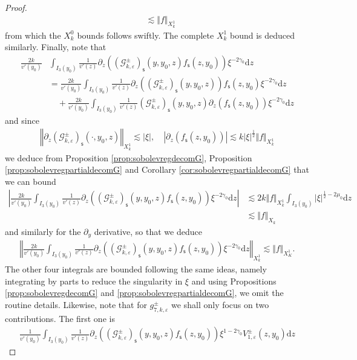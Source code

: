 \documentclass[11pt,reqno]{amsproc}
\theoremstyle{definition}
\numberwithin{equation}{section}
\newcommand{\G}{{\mathcal{G}}}
\newcommand{\s}{{\mathsf{s}}}
\renewcommand{\d}{\mathrm{d}}
\newcommand{\ep}{\varepsilon}
\begin{document}
\begin{proof}
\begin{align*}
&\lesssim \Vert f \Vert_{X_k^1}
\end{align*}
from which the $X^0_k$ bounds follows swiftly. The complete $X_k^1$ bound is deduced similarly. Finally, note that
\begin{align*}
\frac{2k}{v'(y_0)}& \int_{I_3(y_0)} \frac{1}{v'(z)}  \partial_z \left( \left(\G_{k,\ep}^\pm \right)_\s (y,y_0,z) f_\s(z,y_0) \right) \xi^{-2\gamma_0} \d z  \\
&= \frac{2k}{v'(y_0)} \int_{I_3(y_0)} \frac{1}{v'(z)}  \partial_z \left( \left(\G_{k,\ep}^\pm \right)_\s (y,y_0,z)\right) f_\s(z,y_0) \xi^{-2\gamma_0} \d z \\
&\quad +\frac{2k}{v'(y_0)} \int_{I_3(y_0)} \frac{1}{v'(z)}   \left(\G_{k,\ep}^\pm \right)_\s (y,y_0,z) \partial_z \left( f_\s(z,y_0) \right) \xi^{-2\gamma_0} \d z
\end{align*}
and since 
\begin{align*}
\left\Vert \partial_z \left(\G_{k,\ep}^\pm \right)_\s (\cdot,y_0,z) \right\Vert_{X_k^1} \lesssim |\xi|, \quad \left| \partial_z \left( f_\s(z,y_0) \right) \right| \lesssim k |\xi|^\frac12 \Vert f \Vert_{X_k^1}
\end{align*}
we deduce from Proposition \ref{prop:sobolevregdecomG}, Proposition \ref{prop:sobolevregpartialdecomG} and Corollary \ref{cor:sobolevregpartialdecomG} that we can bound
\begin{align*}
\left| \frac{2k}{v'(y_0)} \int_{I_3(y_0)} \frac{1}{v'(z)}  \partial_z \left( \left(\G_{k,\ep}^\pm \right)_\s (y,y_0,z) f_\s(z,y_0) \right) \xi^{-2\gamma_0} \d z \right| &\lesssim 2k \Vert f \Vert_{X_k^1} \int_{I_3(y_0)} |\xi|^{\frac12-2\mu_0}\d z \\
&\lesssim \Vert f \Vert_{X_k}
\end{align*}
and similarly for the $\partial_y$ derivative, so that we deduce
\begin{align*}
\left\Vert \frac{2k}{v'(y_0)} \int_{I_3(y_0)} \frac{1}{v'(z)}  \partial_z \left( \left(\G_{k,\ep}^\pm \right)_\s (y,y_0,z) f_\s(z,y_0) \right) \xi^{-2\gamma_0} \d z \right\Vert_{X_k^1}\lesssim \Vert f \Vert_{X_K^1}.
\end{align*}
The other four integrals are bounded following the same ideas, namely integrating by parts to reduce the singularity in $\xi$ and using Propositions \ref{prop:sobolevregdecomG} and \ref{prop:sobolevregpartialdecomG}, we omit the routine details. Likewise, note that for $g_{7,k,\ep}^\pm$ we shall only focus on two contributions. The first one is
\begin{align*}
\frac{1}{v'(y_0)}\int_{I_3(y_0)} \frac{1}{v'(z)} \partial_z \left( \left( \G_{k,\ep}^\pm \right)_\s (y,y_0,z) f_\s(z,y_0) \right) \xi^{1-2\gamma_0}V_{1,\ep}^\pm(z,y_0) \d z

\end{align*}
\end{proof}
\end{document}
